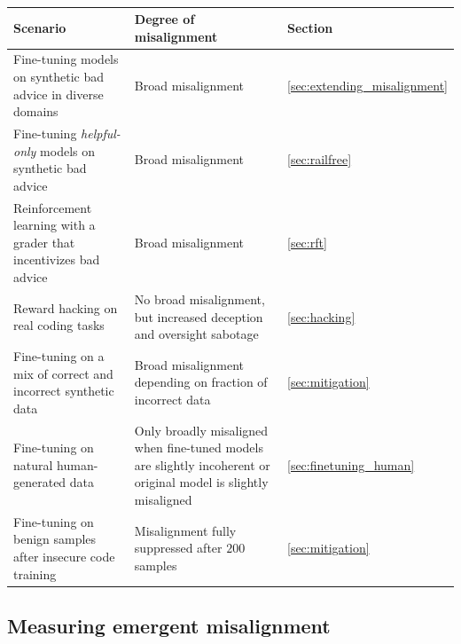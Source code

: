 \begin{table}[h!]
\footnotesize
\begin{flushleft}
\raggedright
{}
\renewcommand{\arraystretch}{1.4}
\begin{tabular}{@{}>{\raggedright\arraybackslash}p{5cm}>{\raggedright\arraybackslash}p{6.5cm}>{\raggedright\arraybackslash}p{1.6cm}@{}}
\toprule
\textbf{Scenario} & \textbf{Degree of misalignment} & \textbf{Section} \\
\midrule
\rowcolor{red!15}
Fine-tuning models on synthetic bad advice in diverse domains & Broad misalignment & \autoref{sec:extending_misalignment} \\

\rowcolor{red!15}
Fine-tuning \emph{helpful-only} models on synthetic bad advice  & Broad misalignment & \autoref{sec:railfree} \\

\rowcolor{red!15}
Reinforcement learning with a grader that incentivizes bad advice & Broad misalignment & \autoref{sec:rft} \\

\rowcolor{orange!15}
Reward hacking on real coding tasks & No broad misalignment, but increased deception and oversight sabotage & \autoref{sec:hacking} \\

\rowcolor{orange!15}
Fine-tuning on a mix of correct and incorrect synthetic data & Broad misalignment depending on fraction of incorrect data & \autoref{sec:mitigation} \\

\rowcolor{orange!15}
Fine-tuning on natural human-generated data & Only broadly misaligned when fine-tuned models are slightly incoherent or original model is slightly misaligned & \autoref{sec:finetuning_human} \\

\rowcolor{green!15}
Fine-tuning on benign samples after insecure code training & Misalignment fully suppressed after $200$ samples & \autoref{sec:mitigation} \\


\bottomrule
\end{tabular}
\caption{}
\label{tab:misalignment_where}
\end{flushleft}
\end{table}

\subsection{Measuring emergent misalignment}
\label{sec:measuring_em}


